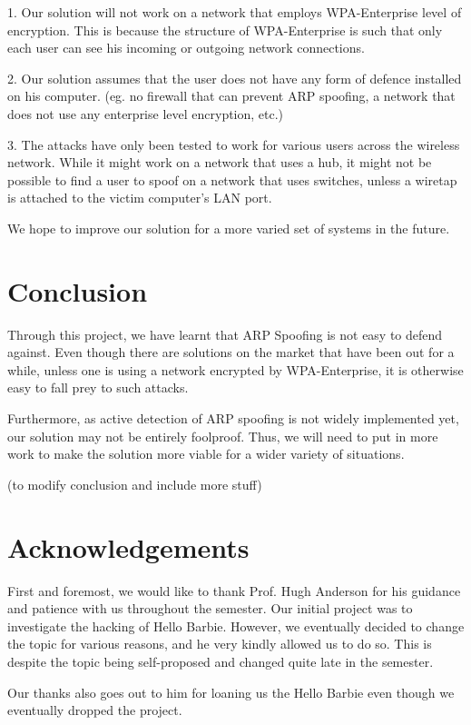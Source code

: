 \documentclass{acm_proc_article-sp}
\begin{document}
1. Our solution will not work on a network that employs WPA-Enterprise level of encryption. This is because the structure of WPA-Enterprise is such that only each user can see his incoming or outgoing network connections. 

2. Our solution assumes that the user does not have any form of defence installed on his computer. (eg. no firewall that can prevent ARP spoofing, a network that does not use any enterprise level encryption, etc.) 

3. The attacks have only been tested to work for various users across the wireless network. While it might work on a network that uses a hub, it might not be possible to find a user to spoof on a network that uses switches, unless a wiretap is attached to the victim computer's LAN port.  

We hope to improve our solution for a more varied set of systems in the future. 

\section{Conclusion}
Through this project, we have learnt that ARP Spoofing is not easy to defend against. Even though there are solutions on the market that have been out for a while, unless one is using a network encrypted by WPA-Enterprise, it is otherwise easy to fall prey to such attacks. 

Furthermore, as active detection of ARP spoofing is not widely implemented yet, our solution may not be entirely foolproof. Thus, we will need to put in more work to make the solution more viable for a wider variety of situations. 

(to modify conclusion and include more stuff) 

\section{Acknowledgements}
First and foremost, we would like to thank Prof. Hugh Anderson for his guidance and patience with us throughout the semester. Our initial project was to investigate the hacking of Hello Barbie. However, we eventually decided to change the topic for various reasons, and he very kindly allowed us to do so. This is despite the topic being self-proposed and changed quite late in the semester. 

Our thanks also goes out to him for loaning us the Hello Barbie even though we eventually dropped the project. 
\end{document}

